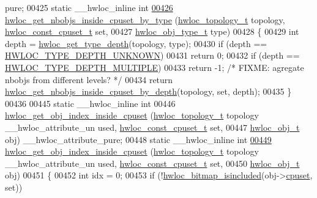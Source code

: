 \begin{DoxyCode}
      pure;
00425 \textcolor{keyword}{static} \_\_hwloc\_inline \textcolor{keywordtype}{int}
\hypertarget{a00031_source_l00426}{}\hyperlink{a00054_ga63481874c69ed257b1a0c03e7615ff97}{00426} \hyperlink{a00054_ga63481874c69ed257b1a0c03e7615ff97}{hwloc_get_nbobjs_inside_cpuset_by_type} (\hyperlink{a00039_ga9d1e76ee15a7dee158b786c30b6a6e38}{hwloc_topology_t} topology, 
      \hyperlink{a00040_ga1f784433e9b606261f62d1134f6a3b25}{hwloc_const_cpuset_t} \textcolor{keyword}{set},
00427                                         \hyperlink{a00041_gacd37bb612667dc437d66bfb175a8dc55}{hwloc_obj_type_t} type)
00428 \{
00429   \textcolor{keywordtype}{int} depth = \hyperlink{a00046_gaea7c64dd59467f5201ba87712710b14d}{hwloc_get_type_depth}(topology, type);
00430   \textcolor{keywordflow}{if} (depth == \hyperlink{a00046_ggaf4e663cf42bbe20756b849c6293ef575a0565ab92ab72cb0cec91e23003294aad}{HWLOC_TYPE_DEPTH_UNKNOWN})
00431     \textcolor{keywordflow}{return} 0;
00432   \textcolor{keywordflow}{if} (depth == \hyperlink{a00046_ggaf4e663cf42bbe20756b849c6293ef575ae99465995cacde6c210d5fc2e409798c}{HWLOC_TYPE_DEPTH_MULTIPLE})
00433     \textcolor{keywordflow}{return} -1; \textcolor{comment}{/* FIXME: agregate nbobjs from different levels? */}
00434   \textcolor{keywordflow}{return} \hyperlink{a00054_ga457604a2dedbf70ba3b480558666b56b}{hwloc_get_nbobjs_inside_cpuset_by_depth}(topology, \textcolor{keyword}{set}, depth);
00435 \}
00436 
00445 \textcolor{keyword}{static} \_\_hwloc\_inline \textcolor{keywordtype}{int}
00446 \hyperlink{a00054_ga7cdb6a4645e9b1ec80137e72d1736fdd}{hwloc_get_obj_index_inside_cpuset} (\hyperlink{a00039_ga9d1e76ee15a7dee158b786c30b6a6e38}{hwloc_topology_t} topology \_\_hwloc\_attribute\_un
      used, \hyperlink{a00040_ga1f784433e9b606261f62d1134f6a3b25}{hwloc_const_cpuset_t} \textcolor{keyword}{set},
00447                                    \hyperlink{a00016}{hwloc_obj_t} obj) \_\_hwloc\_attribute\_pure;
00448 \textcolor{keyword}{static} \_\_hwloc\_inline \textcolor{keywordtype}{int}
\hypertarget{a00031_source_l00449}{}\hyperlink{a00054_ga7cdb6a4645e9b1ec80137e72d1736fdd}{00449} \hyperlink{a00054_ga7cdb6a4645e9b1ec80137e72d1736fdd}{hwloc_get_obj_index_inside_cpuset} (\hyperlink{a00039_ga9d1e76ee15a7dee158b786c30b6a6e38}{hwloc_topology_t} topology \_\_hwloc\_attribute\_un
      used, \hyperlink{a00040_ga1f784433e9b606261f62d1134f6a3b25}{hwloc_const_cpuset_t} \textcolor{keyword}{set},
00450                                    \hyperlink{a00016}{hwloc_obj_t} obj)
00451 \{
00452   \textcolor{keywordtype}{int} idx = 0;
00453   \textcolor{keywordflow}{if} (!\hyperlink{a00065_gaae29e14a926c198e8f91e6e4790621e7}{hwloc_bitmap_isincluded}(obj->\hyperlink{a00016_a67925e0f2c47f50408fbdb9bddd0790f}{cpuset}, \textcolor{keyword}{set}))

\end{DoxyCode}
